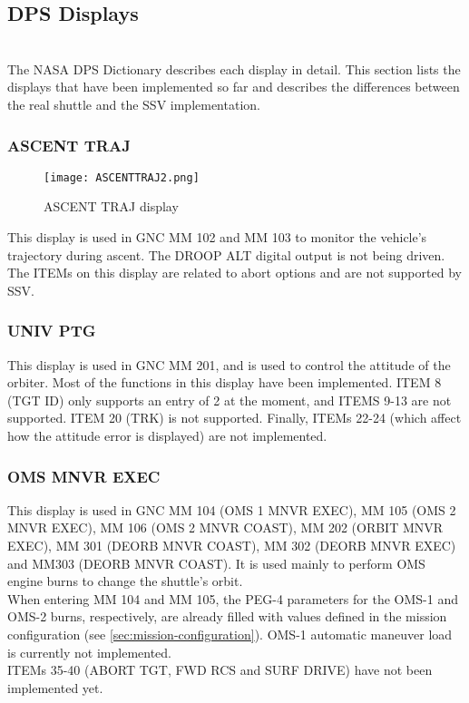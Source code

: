 \documentclass[Space_Shuttle_Vessel_Manual.tex]{subfiles}
\begin{document}
\subsection{DPS Displays}
\begin{multicols*}{2}
\label{sec:dps-displays}
\noindent
\\
The NASA DPS Dictionary describes each display in detail. This section lists the displays that have been implemented so far and describes the differences between the real shuttle and the SSV implementation.


\subsubsection{ASCENT TRAJ}
\begin{figure}[H]
  \texttt{[image: ASCENTTRAJ2.png]}
  \caption{ASCENT TRAJ display}
  \label{fig:ASCENT_TRAJ}
\end{figure}
This display is used in GNC MM 102 and MM 103 to monitor the vehicle's trajectory during ascent. The DROOP ALT digital output is not being driven. The ITEMs on this display are related to abort options and are not supported by SSV.

\subsubsection{UNIV PTG}
This display is used in GNC MM 201, and is used to control the attitude of the orbiter. Most of the functions in this display have been implemented. ITEM 8 (TGT ID) only supports an entry of 2 at the moment, and ITEMS 9-13 are not supported. ITEM 20 (TRK) is not supported. Finally, ITEMs 22-24 (which affect how the attitude error is displayed) are not implemented.

\subsubsection{OMS MNVR EXEC}
This display is used in GNC MM 104 (OMS 1 MNVR EXEC), MM 105 (OMS 2 MNVR EXEC), MM 106 (OMS 2 MNVR COAST), MM 202 (ORBIT MNVR EXEC), MM 301 (DEORB MNVR COAST), MM 302 (DEORB MNVR EXEC) and MM303 (DEORB MNVR COAST). It is used mainly to perform OMS engine burns to change the shuttle's orbit.\\
When entering MM 104 and MM 105, the PEG-4 parameters for the OMS-1 and OMS-2 burns, respectively, are already filled with values defined in the mission configuration (see \ref{sec:mission-configuration}). OMS-1 automatic maneuver load is currently not implemented.\\
ITEMs 35-40 (ABORT TGT, FWD RCS and SURF DRIVE) have not been implemented yet.


\end{multicols*}
\end{document}
